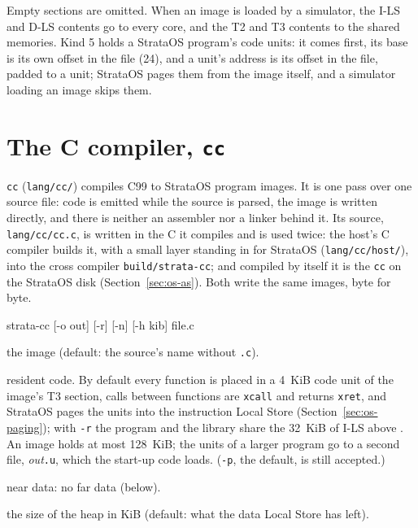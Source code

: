 Empty sections are omitted. When an image is loaded by a simulator, the I-LS and D-LS contents go to
every core, and the T2 and T3 contents to the shared memories. Kind 5 holds a StrataOS program's code
units: it comes first, its base is its own offset in the file (24), and a unit's address is its offset
in the file, padded to a unit; StrataOS pages them from the image itself, and a simulator loading an
image skips them.

\section{The C compiler, \texttt{cc}}\label{sec:cc}

\texttt{cc} (\texttt{lang/cc/}) compiles C99 to StrataOS program images. It is one pass over one source
file: code is emitted while the source is parsed, the image is written directly, and there is neither
an assembler nor a linker behind it. Its source, \texttt{lang/cc/cc.c}, is written in the C it compiles
and is used twice: the host's C compiler builds it, with a small layer standing in for StrataOS
(\texttt{lang/cc/host/}), into the cross compiler \texttt{build/strata-cc}; and compiled by itself it is
the \texttt{cc} on the StrataOS disk (Section~\ref{sec:os-as}). Both write the same images, byte for
byte.

\begin{shell}
strata-cc [-o out] [-r] [-n] [-h kib] file.c
\end{shell}

\begin{description}[leftmargin=1em,style=nextline]
\item[\texttt{-o}] the image (default: the source's name without \texttt{.c}).
\item[\texttt{-r}] resident code. By default every function is placed in a 4~KiB code unit of the
  image's T3 section, calls between functions are \texttt{xcall} and returns \texttt{xret}, and
  StrataOS pages the units into the instruction Local Store (Section~\ref{sec:os-paging}); with
  \texttt{-r} the program and the library share the 32~KiB of I-LS above . An image holds at
  most 128~KiB; the units of a larger program go to a second file, \textit{out}\texttt{.u}, which the
  start-up code loads. (\texttt{-p}, the default, is still accepted.)
\item[\texttt{-n}] near data: no far data (below).
\item[\texttt{-h}] the size of the heap in KiB (default: what the data Local Store has left).
\end{description}

